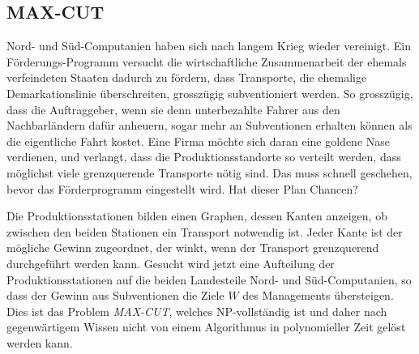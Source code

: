 \subsection{MAX-CUT}
Nord- und Süd-Computanien haben sich nach langem Krieg wieder
vereinigt. Ein Förderungs-Programm versucht die wirtschaftliche
Zusammenarbeit der ehemals verfeindeten Staaten dadurch zu fördern,
dass Transporte, die ehemalige Demarkationslinie überschreiten,
grosszügig subventioniert werden. So grosszügig, dass die
Auftraggeber, wenn sie denn unterbezahlte Fahrer aus den Nachbarländern
dafür anheuern, sogar mehr an Subventionen erhalten können als
die eigentliche Fahrt kostet. Eine Firma möchte sich daran eine
goldene Nase verdienen, und verlangt, dass die Produktionsstandorte so verteilt
werden, dass möglichst viele grenzquerende Transporte nötig sind.
Das muss schnell geschehen, bevor das Förderprogramm eingestellt wird.
Hat dieser Plan Chancen?

\medskip

Die Produktionsstationen bilden einen Graphen, dessen Kanten
anzeigen, ob zwischen den beiden Stationen ein Transport notwendig
ist. Jeder Kante ist der mögliche Gewinn zugeordnet, der winkt,
wenn der Transport grenzquerend durchgeführt werden kann. Gesucht
wird jetzt eine Aufteilung der Produktionsstationen auf die
beiden Landesteile Nord- und Süd-Computanien, so dass der Gewinn
aus Subventionen die Ziele $W$ des Managements übersteigen.
Dies ist das Problem {\it MAX-CUT}, welches NP-vollständig ist
und daher nach gegenwärtigem Wissen nicht von einem Algorithmus
in polynomieller Zeit gelöst werden kann.
